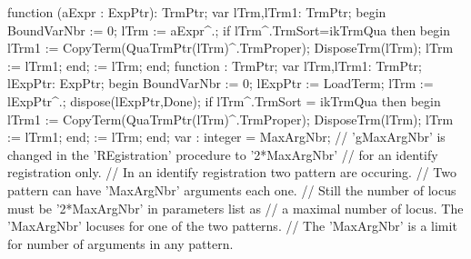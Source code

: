 \nwenddocs{}\endmoddef\nwstartdeflinemarkup{}\nwenddeflinemarkup
function (aExpr : ExpPtr): TrmPtr;
var
   lTrm,lTrm1: TrmPtr;
begin
   BoundVarNbr := 0;
   lTrm := aExpr^.;
   if lTrm^.TrmSort=ikTrmQua then
   begin
      lTrm1 := CopyTerm(QuaTrmPtr(lTrm)^.TrmProper);
      DisposeTrm(lTrm); lTrm := lTrm1;
   end;
    := lTrm;
end;
\eatline
{}\nwendcode{}\nwdocspar
\nwenddocs{}\endmoddef\nwstartdeflinemarkup\nwenddeflinemarkup
function  : TrmPtr;
var
   lTrm,lTrm1: TrmPtr;
   lExpPtr: ExpPtr;
begin
   BoundVarNbr := 0;
   lExpPtr := LoadTerm;
   lTrm := lExpPtr^.;
   dispose(lExpPtr,Done);
   if lTrm^.TrmSort = ikTrmQua then
   begin
      lTrm1 := CopyTerm(QuaTrmPtr(lTrm)^.TrmProper);
      DisposeTrm(lTrm);
      lTrm := lTrm1;
   end;
    := lTrm;
end;
\eatline
{}\nwendcode{}\nwdocspar
\nwenddocs{}\endmoddef\nwstartdeflinemarkup{}\nwenddeflinemarkup
var : integer = MaxArgNbr;
// 'gMaxArgNbr' is changed in the 'REgistration' procedure to '2*MaxArgNbr'
// for an identify registration only.
// In an identify registration two pattern are occuring.
// Two pattern can have 'MaxArgNbr' arguments each one.
// Still the number of locus must be '2*MaxArgNbr' in parameters list as
// a maximal number of locus. The 'MaxArgNbr' locuses for one of the two patterns.
// The 'MaxArgNbr' is a limit for number of arguments in any pattern.

